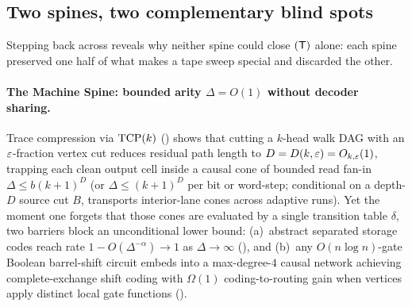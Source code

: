 \subsection{Two spines, two complementary blind spots}\label{sec:blind-spots}

Stepping back across \cite{SeventeenthPaper2026,AdaptiveTransfer2026,SharedDecoders2026} reveals
why neither spine could close $(\mathsf{T})$ alone: each spine preserved one half of what makes a tape
sweep special and discarded the other.

\paragraph{The Machine Spine: bounded arity $\Delta = O(1)$ without decoder sharing.}
Trace compression via $\mathrm{TCP}(k)$ (\cite[Definition~2.3, Proposition~2.4, and
Theorem~7.5]{BoundedStack2026}) shows that cutting a $k$-head walk DAG with an $\varepsilon$-fraction vertex
cut reduces residual path length to $D = D(k,\varepsilon) = O_{k,\varepsilon}(1)$, trapping each clean output cell
inside a causal cone of bounded read fan-in $\Delta \le b(k+1)^D$ (or $\Delta \le (k+1)^D$ per bit
or word-step; conditional on a depth-$D$ source cut $B$, \cite[Lemma~H.2, Theorem~H.5, and
Corollary~H.6]{AdaptiveTransfer2026} transports interior-lane cones across adaptive runs). Yet the
moment one forgets that those cones are evaluated by a single transition table $\delta$, two
barriers block an unconditional lower bound: (a)~abstract separated storage codes reach rate
$1 - O(\Delta^{-\alpha}) \to 1$ as $\Delta \to \infty$ (\cite{StorageCodes2026,HighRate2026}), and
(b)~any $O(n\log n)$-gate Boolean barrel-shift circuit embeds into a max-degree-$4$ causal network
achieving complete-exchange shift coding with $\Omega(1)$ coding-to-routing gain when vertices apply
distinct local gate functions (\cite[Propositions~11.2 and~11.3]{FirstPaper2026}).

